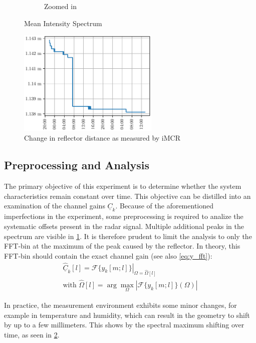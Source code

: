 \begin{figure}[h]
\begin{subfigure}[t]{.45\textwidth}
        \caption{Zoomed in}
    \end{subfigure}
    \caption{Mean Intensity Spectrum}
    \label{fig:avg_intensity}
\end{figure}
\begin{figure}
    \centering
    \includegraphics[width=0.6\textwidth]{../figures/refldist.pdf}
    \caption{Change in reflector distance as measured by iMCR}
    \label{fig:refldist}
\end{figure}
\subsection{Preprocessing and Analysis}
The primary objective of this experiment is to determine whether the system characteristics remain constant over time.
This objective can be distilled into an examination of the channel gains $\underline C_k$.
Because of the aforementioned imperfections in the experiment, some preprocessing is required to analize the systematic offsets present in the radar signal.
Multiple additional peaks in the spectrum are visible in \cref{fig:avg_intensity}.
It is therefore prudent to limit the analysis to only the FFT-bin at the maximum of the peak caused by the reflector.
In theory, this FFT-bin should contain the exact channel gain (see also \cref{eq:y_fft}):
\begin{align}
    \hat{\underline{C}}_k[l] = \left.\mathcal{F}\{ y_k[m;l]\}\right|_{\Omega=\hat \Omega[l]} \\
    \text{with } \hat\Omega[l] = \arg \underset{\Omega}{\max}
    \left|\mathcal{F}\{ y_k[m;l]\}(\Omega)\right|
\end{align}


In practice, the measurement environment exhibits some minor changes, for example in temperature and humidity,
which can result in the geometry to shift by up to a few millimeters.
This shows by the spectral maximum shifting over time, as seen in \cref{fig:refldist}.


